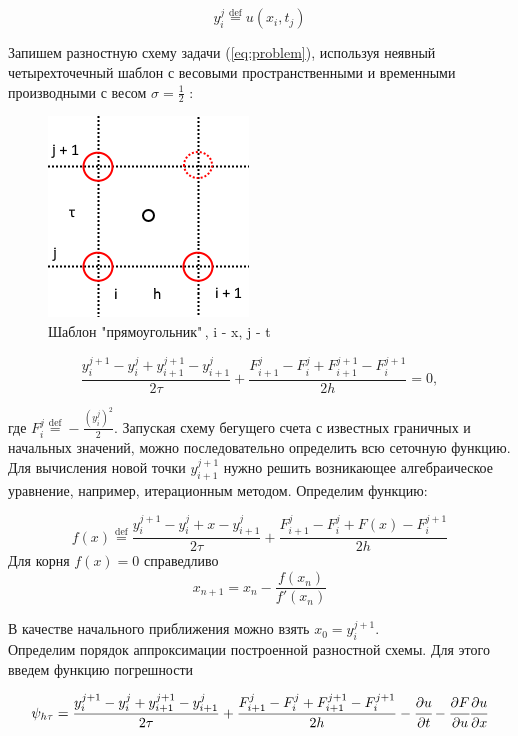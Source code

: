 \documentclass[12pt]{article}
\def\dd#1#2{\cfrac{\partial#1}{\partial#2}}
\begin{document}
		$$y_i^j \overset{\mathrm{def}}{=} u(x_i, t_j)$$
		
		Запишем разностную схему задачи (\ref{eq:problem}), используя неявный четырехточечный шаблон с весовыми пространственными и временными производными с весом $\sigma = \frac{1}{2}$ :
		
		\begin{figure}[h!]
			\begin{center}
				\includegraphics[width=0.5\linewidth]{template}
				\caption{Шаблон "прямоугольник"\,, i - x, j - t}
			\end{center}
		\end{figure}
		
		\begin{equation}
			\frac{y^{j+1}_i - y^j_i + y^{j+1}_{i+1} - y^j_{i+1}}{2\tau} + \frac{F^j_{i+1} - F^j_i + F^{j+1}_{i+1} - F^{j+1}_i}{2h} = 0,
		\end{equation}
		
		где $F^j_i \overset{\mathrm{def}}{=} -\frac{(y^j_i)^2}{2}$. Запуская схему бегущего счета с известных граничных и начальных значений, можно последовательно определить всю сеточную функцию. Для вычисления новой точки $y^{j+1}_{i+1}$ нужно решить возникающее алгебраическое уравнение, например, итерационным методом. Определим функцию:
		
		$$ f(x) \overset{\mathrm{def}}{=} \frac{y^{j+1}_i - y^j_i + x - y^j_{i+1}}{2\tau} + \frac{F^j_{i+1} - F^j_i + F(x) - F^{j+1}_i}{2h}$$
		Для корня $f(x) = 0$ справедливо
		$$x_{n+1} = x_n - \frac{f(x_n)}{f'(x_n)}$$
		
		В качестве начального приближения можно взять $x_0 = y_i^{j+1}$.\\
		Определим порядок аппроксимации построенной разностной схемы. Для этого введем функцию погрешности
		
		\begin{equation}
			\psi_{h\tau} = \frac{y^{j+1}_i - y^j_i + y^{j+1}_{i+1} - y^j_{i+1}}{2\tau} + \frac{F^j_{i+1} - F^j_i + F^{j+1}_{i+1} - F^{j+1}_i}{2h} - \dd{u}t - \dd{F}u\dd{u}x
		\end{equation}
		
\end{document}
